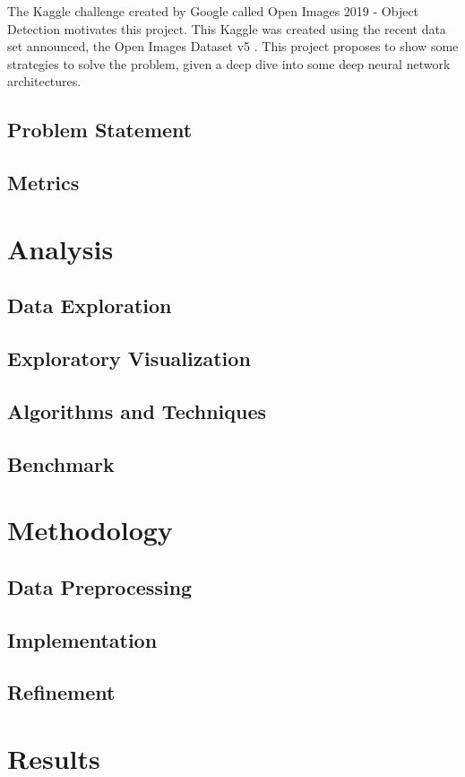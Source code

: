 \documentclass[11pt, a4paper, onecolumn]{article}
\begin{document}
The Kaggle challenge created by Google called Open Images 2019 - Object Detection \cite{kaggle} motivates this project. This Kaggle was created using the recent data set announced, the Open Images Dataset v5 \cite{google:1}. This project proposes to show some strategies to solve the problem, given a deep dive into some deep neural network architectures. 

\subsection{Problem Statement}
\subsection{Metrics}
\section{Analysis}
\subsection{Data Exploration}
\subsection{Exploratory Visualization}
\subsection{Algorithms and Techniques}
\subsection{Benchmark}
\section{Methodology}
\subsection{Data Preprocessing}
\subsection{Implementation}
\subsection{Refinement}
\section{Results}
\end{document}
